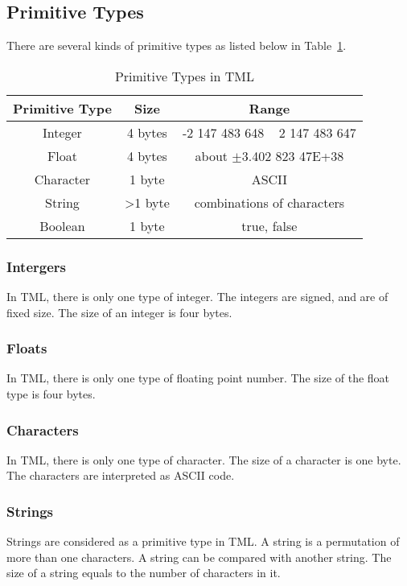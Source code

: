 \documentclass[12pt,psfig,a4]{article}
\begin{document}
\subsection {Primitive Types}
There are several kinds of primitive types as listed below in Table~\ref{pri_types}. 

\begin{table}[ht]
\begin{center}
\begin{tabular}{| c | c | c |}
\hline
\textbf{Primitive Type} & \textbf{Size} & \textbf{Range} \\
\hline
Integer & 4 bytes & -2 147 483 648 ~  2 147 483 647 \\
\hline
Float & 4 bytes & about $\pm$3.402 823 47E+38\\
\hline
Character & 1 byte &  ASCII\\
\hline
String & \textgreater 1 byte & combinations of characters \\
\hline
Boolean & 1 byte & true, false \\
\hline
\end{tabular}
\caption{Primitive Types in TML}
\label{pri_types}
\end {center}
\end{table}

\subsubsection {Intergers}
In TML, there is only one type of integer. The integers are signed, and are of fixed size. The size of an integer is four bytes.

\subsubsection {Floats}
In TML, there is only one type of floating point number. The size of the float type is four bytes.

\subsubsection {Characters}
In TML, there is only one type of character. The size of a character is one byte. The characters are interpreted as ASCII code.

\subsubsection {Strings}
Strings are considered as a primitive type in TML. A string is a permutation of more than one characters. A string can be compared with another string. The size of a string equals to the number of characters in it.
\end{document}
